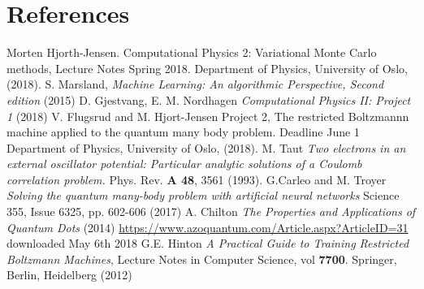 \documentclass[norsk,a4paper,12pt]{article}
\begin{document}
\newpage
\section{References}

\begingroup
\renewcommand{\section}[2]{}
\begin{thebibliography}{}
	Morten Hjorth-Jensen.
	Computational Physics 2: Variational Monte Carlo methods, Lecture Notes Spring 2018.
	Department of Physics, University of Oslo,
	(2018).
	S. Marsland, \emph{Machine Learning: An algorithmic Perspective, Second edition} (2015)
	 D. Gjestvang, E. M. Nordhagen \emph{Computational Physics II: Project 1} (2018)
	 V. Flugsrud and M. Hjort-Jensen
	 Project 2, The restricted Boltzmannn machine applied to the quantum many body problem. Deadline June 1
	 Department of Physics, University of Oslo,
	 (2018).
	 M. Taut \emph{Two electrons in an external oscillator potential: Particular analytic solutions of a Coulomb correlation problem.} Phys. Rev. \textbf{A 48}, 3561 (1993).
	 G.Carleo and M. Troyer  \emph{Solving the quantum many-body problem with artificial neural networks} Science 355, Issue 6325, pp. 602-606 (2017)
	 A. Chilton \emph{The Properties and Applications of Quantum Dots} (2014) \url{https://www.azoquantum.com/Article.aspx?ArticleID=31} downloaded May 6th 2018
	 G.E. Hinton \emph{A Practical Guide to Training Restricted Boltzmann Machines}, Lecture Notes in Computer Science, vol \textbf{7700}. Springer, Berlin, Heidelberg (2012)

	
	
\end{thebibliography}
\endgroup
\end{document}

